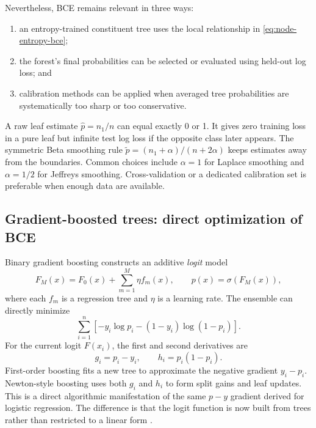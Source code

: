 \documentclass[11pt]{article}
\newcommand{\sigmoid}{\sigma}
\theoremstyle{definition}
\begin{document}
Nevertheless, BCE remains relevant in three ways:
\begin{enumerate}
  \item an entropy-trained constituent tree uses the local relationship in \cref{eq:node-entropy-bce};
  \item the forest's final probabilities can be selected or evaluated using held-out log loss; and
  \item calibration methods can be applied when averaged tree probabilities are systematically too sharp or too conservative.
\end{enumerate}

A raw leaf estimate $\widehat p=n_1/n$ can equal exactly 0 or 1. It gives zero training loss in a pure leaf but infinite test log loss if the opposite class later appears. The symmetric Beta smoothing rule $\widetilde p=(n_1+\alpha)/(n+2\alpha)$ keeps estimates away from the boundaries. Common choices include $\alpha=1$ for Laplace smoothing and $\alpha=1/2$ for Jeffreys smoothing. Cross-validation or a dedicated calibration set is preferable when enough data are available.

\subsection{Gradient-boosted trees: direct optimization of BCE}
\label{app:boosted-trees}

Binary gradient boosting constructs an additive \emph{logit} model
\begin{equation}
F_M(x)=F_0(x)+\sum_{m=1}^{M}\eta f_m(x),
\qquad
p(x)=\sigmoid(F_M(x)),
\label{eq:boosted-logit}
\end{equation}
where each $f_m$ is a regression tree and $\eta$ is a learning rate. The ensemble can directly minimize
\[
\sum_{i=1}^{n}\left[-y_i\log p_i-(1-y_i)\log(1-p_i)\right].
\]
For the current logit $F(x_i)$, the first and second derivatives are
\begin{equation}
g_i=p_i-y_i,
\qquad
h_i=p_i(1-p_i).
\label{eq:boosted-derivatives}
\end{equation}
First-order boosting fits a new tree to approximate the negative gradient $y_i-p_i$. Newton-style boosting uses both $g_i$ and $h_i$ to form split gains and leaf updates. This is a direct algorithmic manifestation of the same $p-y$ gradient derived for logistic regression. The difference is that the logit function is now built from trees rather than restricted to a linear form \cite{friedman2001,chen2016}.
\end{document}
